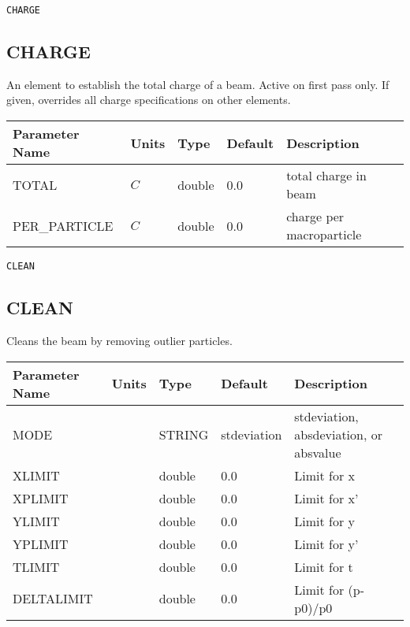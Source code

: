 \begin{latexonly}
\newpage
\begin{center}{\Large\verb|CHARGE|}\end{center}
\end{latexonly}\subsection{CHARGE}
An element to establish the total charge of a beam.  Active on first pass only.  If given, overrides all charge specifications on other elements.
\\
\begin{tabular}{|l|l|l|l|p{\descwidth}|} \hline
Parameter Name & Units & Type & Default & Description \\ \hline 
TOTAL & $C$ & double &  0.0 & total charge in beam  \\ \hline 
PER\_PARTICLE & $C$ & double &  0.0 & charge per macroparticle  \\ \hline 
\end{tabular}

\begin{latexonly}
\newpage
\begin{center}{\Large\verb|CLEAN|}\end{center}
\end{latexonly}\subsection{CLEAN}
Cleans the beam by removing outlier particles.
\\
\begin{tabular}{|l|l|l|l|p{\descwidth}|} \hline
Parameter Name & Units & Type & Default & Description \\ \hline 
MODE &  & STRING &   stdeviation     & stdeviation, absdeviation, or absvalue  \\ \hline 
XLIMIT &  & double &  0.0 & Limit for x  \\ \hline 
XPLIMIT &  & double &  0.0 & Limit for x'  \\ \hline 
YLIMIT &  & double &  0.0 & Limit for y  \\ \hline 
YPLIMIT &  & double &  0.0 & Limit for y'  \\ \hline 
TLIMIT &  & double &  0.0 & Limit for t  \\ \hline 
DELTALIMIT &  & double &  0.0 & Limit for (p-p0)/p0  \\ \hline 
\end{tabular}

